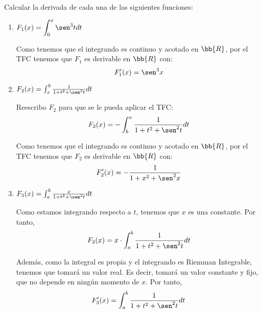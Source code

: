 \begin{ejercicio}
    Calcular la derivada de cada una de las siguientes funciones:
    \begin{enumerate}
        \item $F_1(x) = \displaystyle \int_0^x \sen^3 t dt$

        Como tenemos que el integrando es continuo y acotado en $\bb{R}$, por el TFC tenemos que $F_1$ es derivable en $\bb{R}$ con:
        \begin{equation*}
            F_1'(x) = \sen^3 x
        \end{equation*}
        
        \item $F_2(x) = \int_x^b \frac{1}{1+t^2+\sen^2 t} dt$

        Reescribo $F_2$ para que se le pueda aplicar el TFC:
        \begin{equation*}
            F_2(x) = -\int_b^x \frac{1}{1+t^2+\sen^2 t} dt
        \end{equation*}
        
        Como tenemos que el integrando es continuo y acotado en $\bb{R}$, por el TFC tenemos que $F_2$ es derivable en $\bb{R}$ con:
        \begin{equation*}
            F_2'(x) = -\frac{1}{1+x^2+\sen^2 x}
        \end{equation*}
        
        \item $F_3(x) = \int_a^b \frac{x}{1+t^2+\sen^2 t} dt$

        Como estamos integrando respecto a $t$, tenemos que $x$ es una constante. Por tanto,
        \begin{equation*}
            F_3(x) = x\cdot \int_a^b \frac{1}{1+t^2+\sen^2 t} dt
        \end{equation*}

        Además, como la integral es propia y el integrando es Riemman Integrable, tenemos que tomará un valor real. Es decir, tomará un valor constante y fijo, que no depende en ningún momento de $x$. Por tanto,
        \begin{equation*}
            F_3'(x) = \int_a^b \frac{1}{1+t^2+\sen^2 t} dt
        \end{equation*}
        
    \end{enumerate}
\end{ejercicio}

